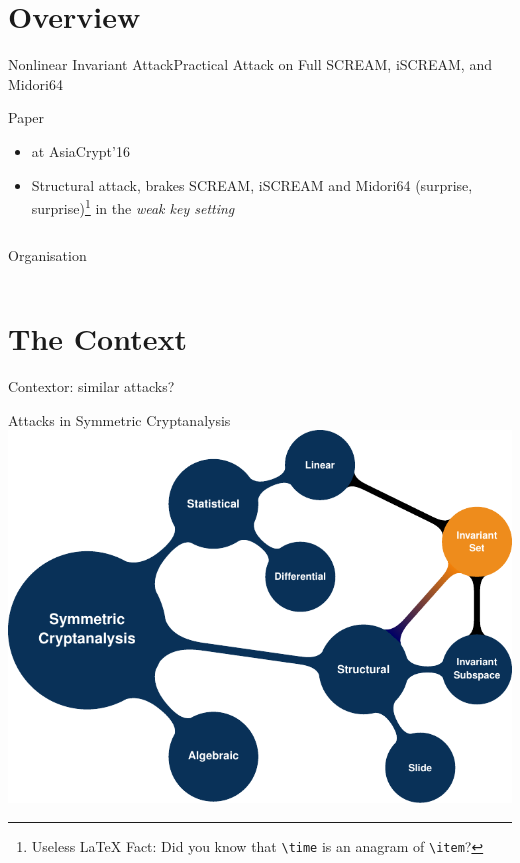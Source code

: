 \section{Overview}
\begin{frame}{Nonlinear Invariant Attack}{Practical Attack on Full SCREAM, iSCREAM, and Midori64}
    \begin{block}{Paper}
        \begin{itemize}
            \item \textcite{AC16:TLS} at AsiaCrypt'16
            \item Structural attack, brakes SCREAM, iSCREAM and Midori64
                  (surprise, surprise)\footnote{Useless \LaTeX{} Fact: Did you know that \texttt{\textbackslash{}time} is an anagram of \texttt{\textbackslash{}item}?}
                  in the \emph{weak key setting}
        \end{itemize}
    \end{block}
    \begin{columns}[T]
        \begin{column}{0.45\textwidth}
            \begin{block}{Organisation}
                \vspace{0.5em}
                \tableofcontents
            \end{block}
        \end{column}
        \begin{column}{0.45\textwidth}
        \end{column}
    \end{columns}
\end{frame}

\section{The Context}
\begin{frame}{Context}{or: similar attacks?}
    \begin{block}{Attacks in Symmetric Cryptanalysis}
        \includegraphics[keepaspectratio, height=0.7\textheight]{data/mindmap}
    \end{block}
\end{frame}

